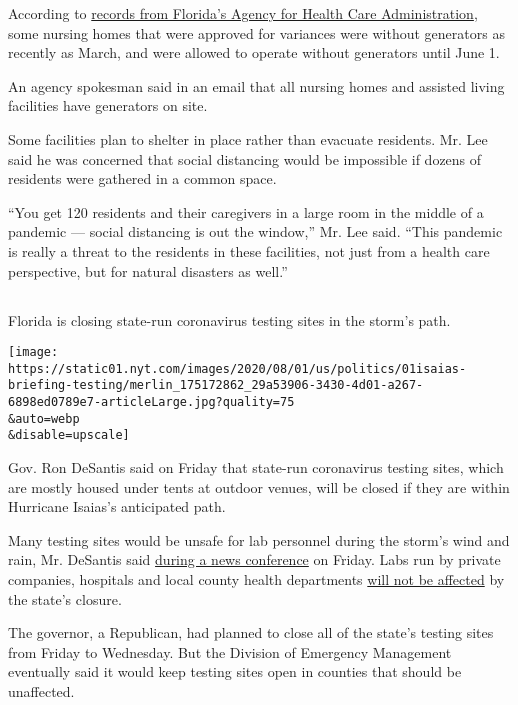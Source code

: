 According to
\href{http://apps.ahca.myflorida.com/dm_web/(S(1v0gkxzpdxlo2x3vtgyf1qxk))/doc_results_fo.aspx}{records
from Florida's Agency for Health Care Administration}, some nursing
homes that were approved for variances were without generators as
recently as March, and were allowed to operate without generators until
June 1.

An agency spokesman said in an email that all nursing homes and assisted
living facilities have generators on site.

Some facilities plan to shelter in place rather than evacuate residents.
Mr. Lee said he was concerned that social distancing would be impossible
if dozens of residents were gathered in a common space.

``You get 120 residents and their caregivers in a large room in the
middle of a pandemic --- social distancing is out the window,'' Mr. Lee
said. ``This pandemic is really a threat to the residents in these
facilities, not just from a health care perspective, but for natural
disasters as well.''

\hypertarget{-3}{%
\subsection{}\label{-3}}

Florida is closing state-run coronavirus testing sites in the storm's
path.

\texttt{[image: https://static01.nyt.com/images/2020/08/01/us/politics/01isaias-briefing-testing/merlin\_175172862\_29a53906-3430-4d01-a267-6898ed0789e7-articleLarge.jpg?quality=75\\\&auto=webp\\\&disable=upscale]}

Gov. Ron DeSantis said on Friday that state-run coronavirus testing
sites, which are mostly housed under tents at outdoor venues, will be
closed if they are within Hurricane Isaias's anticipated path.

Many testing sites would be unsafe for lab personnel during the storm's
wind and rain, Mr. DeSantis said
\href{https://www.youtube.com/watch?v=FsKIF5je_bo}{during a news
conference} on Friday. Labs run by private companies, hospitals and
local county health departments
\href{https://www.floridadisaster.org/news-media/news/20200729-all-state-supported-testing-sites-temporarily-close-for-potential-tropical-cyclone-nine/}{will
not be affected} by the state's closure.

The governor, a Republican, had planned to close all of the state's
testing sites from Friday to Wednesday. But the Division of Emergency
Management eventually said it would keep testing sites open in counties
that should be unaffected.

